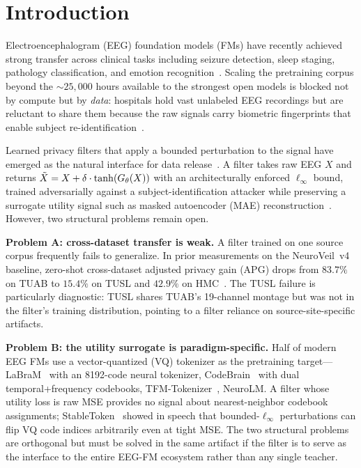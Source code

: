 \section{Introduction}
\label{sec:intro}

Electroencephalogram (EEG) foundation models (FMs) have recently achieved strong transfer across clinical tasks including seizure detection, sleep staging, pathology classification, and emotion recognition~\citep{labram,eegpt,cbramod,biot,reve}. Scaling the pretraining corpus beyond the ${\sim}25{,}000$ hours available to the strongest open models is blocked not by compute but by \emph{data}: hospitals hold vast unlabeled EEG recordings but are reluctant to share them because the raw signals carry biometric fingerprints that enable subject re-identification~\citep{eeg_biometric_survey,fallahi2026eeg_biometric,eeg_reidentification}.

Learned privacy filters that apply a bounded perturbation to the signal have emerged as the natural interface for data release~\citep{unlearnable_eeg_meng,adversarial_filter,wang2025idremovalnet}. A filter takes raw EEG $X$ and returns $\tilde{X} = X + \delta\cdot\tanh(G_\theta(X))$ with an architecturally enforced $\ell_\infty$ bound, trained adversarially against a subject-identification attacker while preserving a surrogate utility signal such as masked autoencoder (MAE) reconstruction~\citep{mae}. However, two structural problems remain open.

\textbf{Problem A: cross-dataset transfer is weak.} A filter trained on one source corpus frequently fails to generalize. In prior measurements on the NeuroVeil~v4 baseline, zero-shot cross-dataset adjusted privacy gain (APG) drops from $83.7\%$ on TUAB to $15.4\%$ on TUSL and $42.9\%$ on HMC~\citep{neuroveil_v4}. The TUSL failure is particularly diagnostic: TUSL shares TUAB's 19-channel montage but was not in the filter's training distribution, pointing to a filter reliance on source-site-specific artifacts.

\textbf{Problem B: the utility surrogate is paradigm-specific.} Half of modern EEG FMs use a vector-quantized (VQ) tokenizer as the pretraining target---LaBraM~\citep{labram} with an 8192-code neural tokenizer, CodeBrain~\citep{codebrain} with dual temporal+frequency codebooks, TFM-Tokenizer~\citep{tfm_tokenizer}, NeuroLM. A filter whose utility loss is raw MSE provides no signal about nearest-neighbor codebook assignments; StableToken~\citep{stabletoken} showed in speech that bounded-$\ell_\infty$ perturbations can flip VQ code indices arbitrarily even at tight MSE. The two structural problems are orthogonal but must be solved in the same artifact if the filter is to serve as the interface to the entire EEG-FM ecosystem rather than any single teacher.

